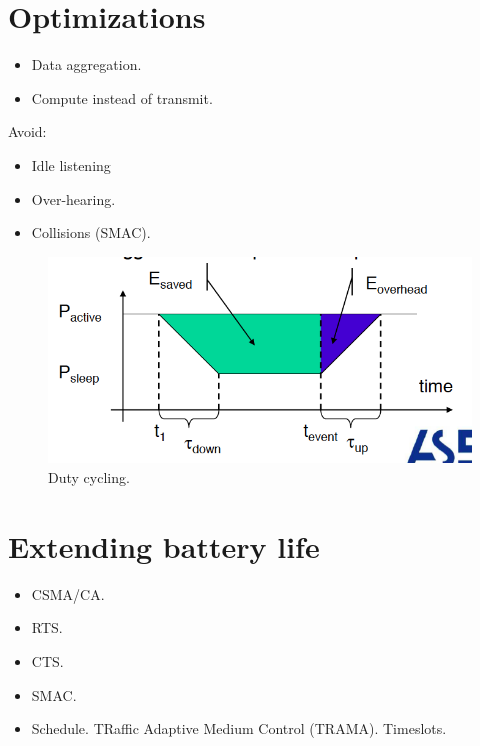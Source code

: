 \section{Optimizations}
\begin{itemize}
\item Data aggregation.
\item Compute instead of transmit.
\end{itemize}
Avoid:
\begin{itemize}
\item Idle listening
\item Over-hearing.
\item Collisions (SMAC).
\end{itemize}
\begin{figure}[H]
  \centering
    \includegraphics[scale=0.5,trim={20 10 27 20},clip=true]{img/EnergySources-DutyCycling.png}
    \caption{Duty cycling.}
\end{figure}


\section{Extending battery life}

\begin{itemize}
\item CSMA/CA.
\item RTS.
\item CTS.
\item SMAC.
\item Schedule. TRaffic Adaptive Medium Control (TRAMA). Timeslots.
\end{itemize}

